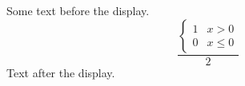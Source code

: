 \documentclass[12pt]{article}
\begin{document}
Some text before the display.
\[ \frac{\begin{cases} 1 & x > 0 \\ 0 & x \leq 0 \end{cases}}{2} \]
Text after the display.
\end{document}
